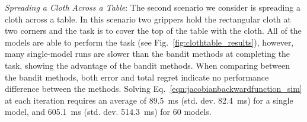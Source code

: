 \textit{Spreading a Cloth Across a Table}: The second scenario we consider is spreading a cloth across a table. In this scenario two grippers hold the rectangular cloth at two corners and the task is to cover the top of the table with the cloth. All of the models are able to perform the task (see Fig.~\ref{fig:clothtable_results}), however, many single-model runs are slower than the bandit methods at completing the task, showing the advantage of the bandit methods. When comparing between the bandit methods, both error and total regret indicate no performance difference between the methods. Solving Eq.~\eqref{eqn:jacobianbackwardfunction_sim} at each iteration requires an average of 89.5~ms (std. dev. 82.4~ms) for a single model, and 605.1~ms (std. dev. 514.3~ms) for 60 models.


\begin{figure*}[t]
    \centering
    \vspace{-0.1in}
    \\
    \vspace{-0.15in}
    \vspace{-0.1in}
    \caption{Experimental results for the table coverage task. See Fig.~\ref{fig:ropecylinder_results} for description.}
    \label{fig:clothtable_results}
\end{figure*}



